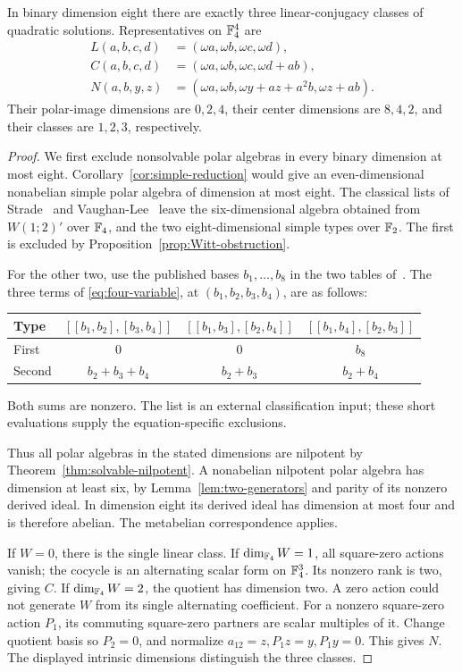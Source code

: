 \begin{theorem}\label{thm:dimension-eight}
In binary dimension eight there are exactly three linear-conjugacy
classes of quadratic solutions. Representatives on \(\mathbb F_4^4\) are
\begin{align*}
 L(a,b,c,d)&=(\omega a,\omega b,\omega c,\omega d),\\
 C(a,b,c,d)&=(\omega a,\omega b,\omega c,\omega d+ab),\\
 N(a,b,y,z)&=(\omega a,\omega b,\omega y+az+a^2b,\omega z+ab).
\end{align*}
Their polar-image dimensions are \(0,2,4\), their center dimensions
are \(8,4,2\), and their classes are \(1,2,3\), respectively.
\end{theorem}
\begin{proof}
We first exclude nonsolvable polar algebras in every binary dimension
at most eight. Corollary~\ref{cor:simple-reduction} would give an
even-dimensional nonabelian simple polar algebra of dimension at most
eight. The classical lists of Strade~\cite{Strade2006} and
Vaughan-Lee~\cite[Theorem~1]{VaughanLee2006} leave the six-dimensional
algebra obtained from \(W(1;2)'\) over \(\mathbb F_4\), and the two
eight-dimensional simple types over \(\mathbb F_2\).
The first is excluded by Proposition~\ref{prop:Witt-obstruction}.

For the other two, use the published bases \(b_1,\ldots,b_8\) in
the two tables of~\cite[Section~3.6]{LieAlgDB}.
The three terms of \eqref{eq:four-variable}, at
\((b_1,b_2,b_3,b_4)\), are as follows:
\begin{center}
\begin{tabular}{@{}lccc@{}}
\toprule
Type&\([[b_1,b_2],[b_3,b_4]]\)&
\([[b_1,b_3],[b_2,b_4]]\)&\([[b_1,b_4],[b_2,b_3]]\)\\
\midrule
First&\(0\)&\(0\)&\(b_8\)\\
Second&\(b_2+b_3+b_4\)&\(b_2+b_3\)&\(b_2+b_4\)\\
\bottomrule
\end{tabular}
\end{center}
Both sums are nonzero. The list is an external classification input;
these short evaluations supply the equation-specific exclusions.

Thus all polar algebras in the stated dimensions are nilpotent by
Theorem~\ref{thm:solvable-nilpotent}. A nonabelian nilpotent polar
algebra has dimension at least six, by
Lemma~\ref{lem:two-generators} and parity of its nonzero derived ideal.
In dimension eight its derived ideal has dimension at most four and
is therefore abelian. The metabelian correspondence applies.

If \(W=0\), there is the single linear class.
If \(\dim_{\mathbb F_4}W=1\), all square-zero actions vanish; the cocycle
is an alternating scalar form on \(\mathbb F_4^3\). Its nonzero rank is two,
giving \(C\).
If \(\dim_{\mathbb F_4}W=2\), the quotient has dimension two.
A zero action could not generate \(W\) from its single alternating
coefficient. For a nonzero square-zero action \(P_1\), its commuting
square-zero partners are scalar multiples of it. Change quotient basis
so \(P_2=0\), and normalize
\(a_{12}=z,P_1z=y,P_1y=0\). This gives \(N\).
The displayed intrinsic dimensions distinguish the three classes.
\end{proof}

